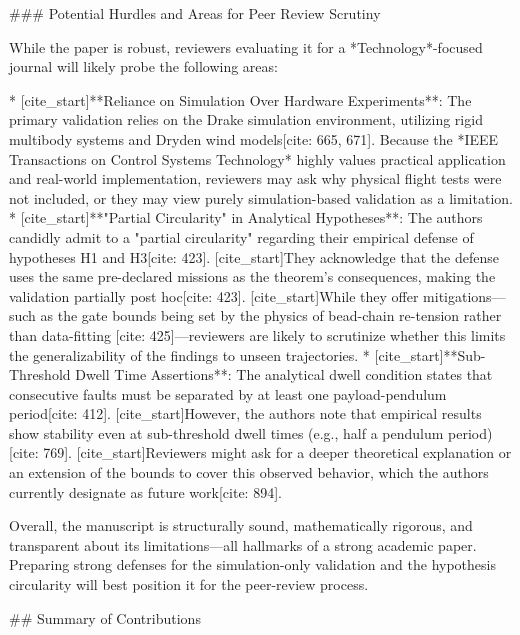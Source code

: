 ### Potential Hurdles and Areas for Peer Review Scrutiny

While the paper is robust, reviewers evaluating it for a *Technology*-focused journal will likely probe the following areas:

* [cite_start]**Reliance on Simulation Over Hardware Experiments**: The primary validation relies on the Drake simulation environment, utilizing rigid multibody systems and Dryden wind models[cite: 665, 671]. Because the *IEEE Transactions on Control Systems Technology* highly values practical application and real-world implementation, reviewers may ask why physical flight tests were not included, or they may view purely simulation-based validation as a limitation.
* [cite_start]**"Partial Circularity" in Analytical Hypotheses**: The authors candidly admit to a "partial circularity" regarding their empirical defense of hypotheses H1 and H3[cite: 423]. [cite_start]They acknowledge that the defense uses the same pre-declared missions as the theorem's consequences, making the validation partially post hoc[cite: 423]. [cite_start]While they offer mitigations—such as the gate bounds being set by the physics of bead-chain re-tension rather than data-fitting [cite: 425]—reviewers are likely to scrutinize whether this limits the generalizability of the findings to unseen trajectories.
* [cite_start]**Sub-Threshold Dwell Time Assertions**: The analytical dwell condition states that consecutive faults must be separated by at least one payload-pendulum period[cite: 412]. [cite_start]However, the authors note that empirical results show stability even at sub-threshold dwell times (e.g., half a pendulum period)[cite: 769]. [cite_start]Reviewers might ask for a deeper theoretical explanation or an extension of the bounds to cover this observed behavior, which the authors currently designate as future work[cite: 894].

Overall, the manuscript is structurally sound, mathematically rigorous, and transparent about its limitations—all hallmarks of a strong academic paper. Preparing strong defenses for the simulation-only validation and the hypothesis circularity will best position it for the peer-review process.


## Summary of Contributions

